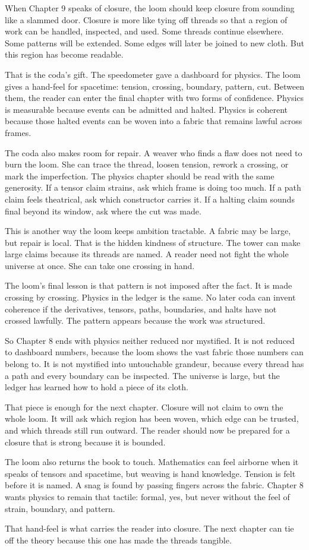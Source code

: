 When Chapter 9 speaks of closure, the loom should keep closure from sounding
like a slammed door. Closure is more like tying off threads so that a region of
work can be handled, inspected, and used. Some threads continue elsewhere. Some
patterns will be extended. Some edges will later be joined to new cloth. But
this region has become readable.

That is the coda's gift. The speedometer gave a dashboard for physics. The loom
gives a hand-feel for spacetime: tension, crossing, boundary, pattern, cut.
Between them, the reader can enter the final chapter with two forms of
confidence. Physics is measurable because events can be admitted and halted.
Physics is coherent because those halted events can be woven into a fabric that
remains lawful across frames.

The coda also makes room for repair. A weaver who finds a flaw does not need to
burn the loom. She can trace the thread, loosen tension, rework a crossing, or
mark the imperfection. The physics chapter should be read with the same
generosity. If a tensor claim strains, ask which frame is doing too much. If a
path claim feels theatrical, ask which constructor carries it. If a halting
claim sounds final beyond its window, ask where the cut was made.

This is another way the loom keeps ambition tractable. A fabric may be large,
but repair is local. That is the hidden kindness of structure. The tower can
make large claims because its threads are named. A reader need not fight the
whole universe at once. She can take one crossing in hand.

The loom's final lesson is that pattern is not imposed after the fact. It is
made crossing by crossing. Physics in the ledger is the same. No later coda can
invent coherence if the derivatives, tensors, paths, boundaries, and halts have
not crossed lawfully. The pattern appears because the work was structured.

So Chapter 8 ends with physics neither reduced nor mystified. It is not reduced
to dashboard numbers, because the loom shows the vast fabric those numbers can
belong to. It is not mystified into untouchable grandeur, because every thread
has a path and every boundary can be inspected. The universe is large, but the
ledger has learned how to hold a piece of its cloth.

That piece is enough for the next chapter. Closure will not claim to own the
whole loom. It will ask which region has been woven, which edge can be trusted,
and which threads still run outward. The reader should now be prepared for a
closure that is strong because it is bounded.

The loom also returns the book to touch. Mathematics can feel airborne when it
speaks of tensors and spacetime, but weaving is hand knowledge. Tension is felt
before it is named. A snag is found by passing fingers across the fabric.
Chapter 8 wants physics to remain that tactile: formal, yes, but never without
the feel of strain, boundary, and pattern.

That hand-feel is what carries the reader into closure. The next chapter can
tie off the theory because this one has made the threads tangible.
